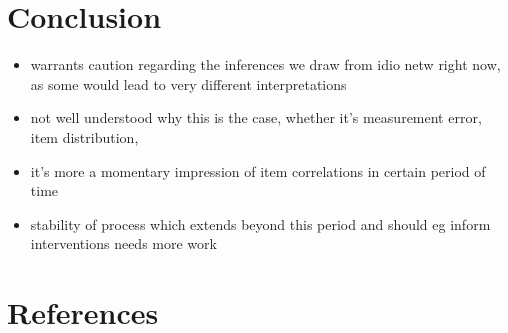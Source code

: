 \documentclass[
  english,
  man]{apa6}
\providecommand{\tightlist}{%
  \setlength{\itemsep}{0pt}\setlength{\parskip}{0pt}}
\begin{document}
\hypertarget{conclusion}{%
\section{Conclusion}\label{conclusion}}

\begin{itemize}
\tightlist
\item
  warrants caution regarding the inferences we draw from idio netw right now, as some would lead to very different interpretations
\item
  not well understood why this is the case, whether it's measurement error, item distribution,
\item
  it's more a momentary impression of item correlations in certain period of time
\item
  stability of process which extends beyond this period and should eg inform interventions needs more work
\end{itemize}

\newpage

\hypertarget{references}{%
\section{References}\label{references}}

\begingroup
\setlength{\parindent}{-0.5in}
\setlength{\leftskip}{0.5in}
\end{document}

